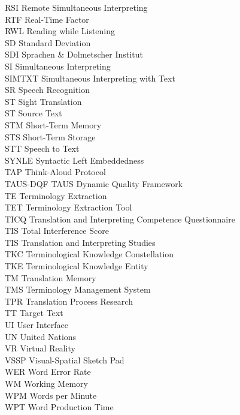\begin{tabbing}
{RSI}  \>  Remote Simultaneous Interpreting\\
{RTF}  \>  Real-Time Factor\\
{RWL}  \>  Reading while Listening\\
{SD}  \>  Standard Deviation\\
{SDI}  \>  Sprachen \& Dolmetscher Institut\\
{SI}  \>  Simultaneous Interpreting\\
{SIMTXT}  \>  Simultaneous Interpreting with Text\\
{SR}  \>  Speech Recognition\\
{ST}  \>  Sight Translation\\
{ST}  \>  Source Text\\
{STM}  \>  Short-Term Memory\\
{STS}  \>    Short-Term Storage\\
{STT}  \>  Speech to Text\\
{SYNLE}  \>   Syntactic Left Embeddedness\\
{TAP}  \>   Think-Aloud Protocol\\
{TAUS-DQF}  \>   TAUS Dynamic Quality Framework\\
{TE}  \>   Terminology Extraction\\
{TET}  \>   Terminology Extraction Tool\\
{TICQ}  \>   Translation and Interpreting Competence Questionnaire\\
{TIS}  \>   Total Interference Score\\
{TIS}  \>   Translation and Interpreting Studies\\
{TKC}  \>   Terminological Knowledge Constellation\\
{TKE}  \>   Terminological Knowledge Entity\\
{TM}  \>   Translation Memory\\
{TMS}  \>   Terminology Management System\\
{TPR}  \>   Translation Process Research\\
{TT}  \>   Target Text\\
{UI}  \>   User Interface\\
{UN}  \>   United Nations\\
{VR}  \>   Virtual Reality\\
{VSSP}  \>   Visual-Spatial Sketch Pad\\
{WER}  \>   Word Error Rate\\
{WM}  \>    Working Memory\\
{WPM}  \>   Words per Minute\\
{WPT}  \>   Word Production Time
\end{tabbing}
